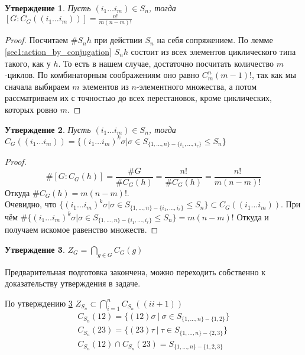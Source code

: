 \documentclass{article}
\newtheorem{statement}{Утверждение}
\newcommand{\icycle}[3]{(#1_{#2} \dots #1_{#3})}
\newcommand{\srange}[2]{\{#1, \dots, #2\}}
\newcommand{\irange}[3]{#1_{#2}, \dots, #1_{#3}}
\newcommand{\subgroup}{\leq}
\begin{document}
\begin{statement}
Пусть $\icycle{i}{1}{m} \in S_n$, тогда $[G: C_G(\icycle{i}{1}{m})] = \frac{n!}{m(n - m)!}$
\end{statement}

\begin{proof}
Посчитаем $\#S_{n}h$ при действии $S_n$ на себя сопряжением.
По лемме \ref{sec1:action_by_conjugation} $S_{n}h$ состоит из всех элементов циклического типа такого, как у $h$.
То есть в нашем случае, достаточно посчитать количество $m$-циклов.
По комбинаторным соображениям оно равно $C^{n}_{m} (m - 1)!$, 
так как мы сначала выбираем $m$ элементов из $n$-элементного множества, 
а потом рассматриваем их с точностью до всех перестановок, кроме циклических, которых ровно $m$.
\end{proof}

\begin{statement}
\label{sec2:cyclecentralizer}
Пусть $\icycle{i}{1}{m} \in S_n$, тогда $C_G(\icycle{i}{1}{m}) = \{\icycle{i}{1}{m}^k \sigma | \sigma \in S_{\srange{1}{n} - \{\irange{i}{1}{r}\}} \subgroup S_n\}$
\end{statement}

\begin{proof}
    \begin{equation*}
        \#[G: C_G(h)] = \frac{\#G}{\#C_G(h)} = \frac{n!}{\#C_G(h)} = \frac{n!}{m(n - m)!}    
    \end{equation*}
Откуда $\#C_G(h) = m (n - m)!$. \\
Очевидно, что $\{\icycle{i}{1}{m}^k \sigma | \sigma \in S_{\srange{1}{n} - \{\irange{i}{1}{r}\}} \subgroup S_n\} \subset C_G(\icycle{i}{1}{m})$.
При чём $\#\{\icycle{i}{1}{m}^k \sigma | \sigma \in S_{\srange{1}{n} - \{\irange{i}{1}{r}\}} \subgroup S_n\} = m (n - m)!$
Откуда и получаем искомое равенство множеств.
\end{proof}

\begin{statement}
\label{sec2:center}
$Z_{G} = \bigcap_{g \in G}C_G(g)$
\end{statement}

Предварительная подготовка закончена, 
можно переходить собственно к доказательству утверждения в задаче. 

По утверждению \ref{sec2:center} $Z_{S_n} \subset \bigcap_{i = 1}^{n}C_{S_n}((i i+1))$
\begin{gather*}
    C_{S_n}(12) = \{(12) \sigma ~ | ~ \sigma \in S_{\srange{1}{n} - \{1, 2\}}\} \\ 
    C_{S_n}(23) = \{(23) \tau ~ | ~ \tau \in S_{\srange{1}{n} - \{2, 3\}}\} \\
    C_{S_n}(12) \cap C_{S_n}(23) = S_{\srange{1}{n} - \{1, 2, 3\}}
\end{gather*}
\end{document}
